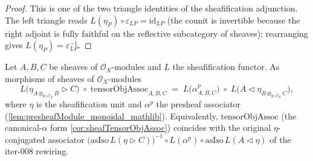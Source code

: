 \begin{proof}
  \leanok
  This is one of the two triangle identities of the sheafification adjunction. The
  left triangle reads \(L(\eta_P) \circ \varepsilon_{LP} = \mathrm{id}_{LP}\) (the
  counit is invertible because the right adjoint is fully faithful on the reflective
  subcategory of sheaves); rearranging gives \(L(\eta_P) = \varepsilon_{LP}^{-1}\).
\end{proof}

\begin{lemma}

  \label{lem:tensorObjAssoc_eta_factor_sheaf}
  Let \(A, B, C\) be sheaves of \(\mathcal{O}_X\)-modules and \(L\) the sheafification
  functor. As morphisms of sheaves of \(\mathcal{O}_X\)-modules
  \[
    L\bigl(\eta_{A \otimes_{p,\mathcal{O}_X} B} \rhd C\bigr)
      \;\circ\; \mathrm{tensorObjAssoc}_{A,B,C}
    \;=\;
    L\bigl(\alpha^{p}_{A,B,C}\bigr)
      \;\circ\; L\bigl(A \lhd \eta_{B \otimes_{p,\mathcal{O}_X} C}\bigr),
  \]
  where \(\eta\) is the sheafification unit and \(\alpha^{p}\) the presheaf
  associator (\cref{lem:presheafModule_monoidal_mathlib}). Equivalently,
  \(\mathrm{tensorObjAssoc}\) (the canonical-\(\alpha\) form
  \cref{cor:sheafTensorObjAssoc}) coincides with the original \(\eta\)-conjugated
  associator \(\bigl(\mathrm{asIso}\,L(\eta \rhd C)\bigr)^{-1}
  \circ L(\alpha^{p}) \circ \mathrm{asIso}\,L(A \lhd \eta)\) of the iter-008 rewiring.
\end{lemma}

